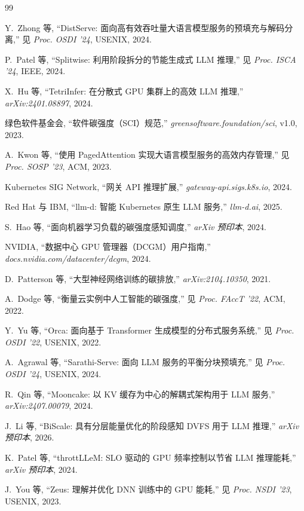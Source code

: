 \begin{thebibliography}{99}

Y.~Zhong 等, ``DistServe: 面向高有效吞吐量大语言模型服务的预填充与解码分离,'' 见 \emph{Proc. OSDI '24}, USENIX, 2024.

P.~Patel 等, ``Splitwise: 利用阶段拆分的节能生成式 LLM 推理,'' 见 \emph{Proc. ISCA '24}, IEEE, 2024.

X.~Hu 等, ``TetriInfer: 在分散式 GPU 集群上的高效 LLM 推理,'' \emph{arXiv:2401.08897}, 2024.

绿色软件基金会, ``软件碳强度（SCI）规范,'' \emph{greensoftware.foundation/sci}, v1.0, 2023.

A.~Kwon 等, ``使用 PagedAttention 实现大语言模型服务的高效内存管理,'' 见 \emph{Proc. SOSP '23}, ACM, 2023.

Kubernetes SIG Network, ``网关 API 推理扩展,'' \emph{gateway-api.sigs.k8s.io}, 2024.

Red Hat 与 IBM, ``llm-d: 智能 Kubernetes 原生 LLM 服务,'' \emph{llm-d.ai}, 2025.

S.~Hao 等, ``面向机器学习负载的碳强度感知调度,'' \emph{arXiv 预印本}, 2024.

NVIDIA, ``数据中心 GPU 管理器（DCGM）用户指南,'' \emph{docs.nvidia.com/datacenter/dcgm}, 2024.

D.~Patterson 等, ``大型神经网络训练的碳排放,'' \emph{arXiv:2104.10350}, 2021.

A.~Dodge 等, ``衡量云实例中人工智能的碳强度,'' 见 \emph{Proc. FAccT '22}, ACM, 2022.

Y.~Yu 等, ``Orca: 面向基于 Transformer 生成模型的分布式服务系统,'' 见 \emph{Proc. OSDI '22}, USENIX, 2022.

A.~Agrawal 等, ``Sarathi-Serve: 面向 LLM 服务的平衡分块预填充,'' 见 \emph{Proc. OSDI '24}, USENIX, 2024.

R.~Qin 等, ``Mooncake: 以 KV 缓存为中心的解耦式架构用于 LLM 服务,'' \emph{arXiv:2407.00079}, 2024.

J.~Li 等, ``BiScale: 具有分层能量优化的阶段感知 DVFS 用于 LLM 推理,'' \emph{arXiv 预印本}, 2026.

K.~Patel 等, ``throttLLeM: SLO 驱动的 GPU 频率控制以节省 LLM 推理能耗,'' \emph{arXiv 预印本}, 2024.

J.~You 等, ``Zeus: 理解并优化 DNN 训练中的 GPU 能耗,'' 见 \emph{Proc. NSDI '23}, USENIX, 2023.


\end{thebibliography}
